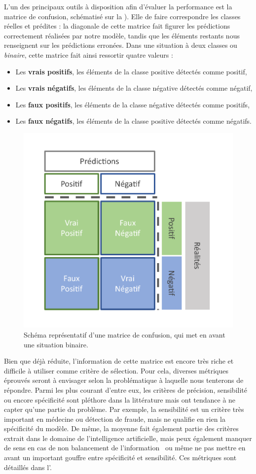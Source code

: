 L’un des principaux outils à disposition afin d'évaluer la performance est la matrice de confusion, schématisé sur la ). Elle de faire correspondre les classes réelles et prédites : la diagonale de cette matrice fait figurer les prédictions correctement réalisées par notre modèle, tandis que les éléments restants nous renseignent sur les prédictions erronées. Dans une situation à deux classes ou \textit{binaire}, cette matrice fait ainsi ressortir quatre valeurs :
\begin{itemize}
	\item Les \textbf{vrais positifs}, les éléments de la classe positive détectés comme positif,
	\item Les \textbf{vrais négatifs}, les éléments de la classe négative détectés comme négatif,
	\item Les \textbf{faux positifs}, les éléments de la classe négative détectés comme positifs,
	\item Les \textbf{faux négatifs}, les éléments de la classe positive détectés comme négatifs.
\end{itemize}\par

\begin{figure}[H]
    \centering
    \includegraphics[width=0.6\linewidth]{contents/chapter_3/resources/scheme_confusion_matrix.pdf}
    \caption{Schéma représentatif d’une matrice de confusion, qui met en avant une situation binaire.}
    \label{fig:scheme_confusion_matrix}
\end{figure}

Bien que déjà réduite, l'information de cette matrice est encore très riche et difficile à utiliser comme critère de sélection. Pour cela, diverses métriques éprouvés seront à envisager selon la problématique à laquelle nous tenterons de répondre. Parmi les plus courant d'entre eux, les critères de précision, sensibilité ou encore spécificité sont pléthore dans la littérature mais ont tendance à ne capter qu'une partie du problème. Par exemple, la sensibilité est un critère très important en médecine ou détection de fraude, mais ne qualifie en rien la spécificité du modèle. De même, la moyenne fait également partie des critères extrait dans le domaine de l'intelligence artificielle, mais peux également manquer de sens en cas de non balancement de l'information~\cite{Guo2008} ou même ne pas mettre en avant un important gouffre entre spécificité et sensibilité. Ces métriques sont détaillés dans l'.\par

